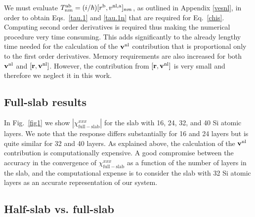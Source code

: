 \documentclass[floatfix,prb,aps,superscriptaddress,11pt,preprint,letterpaper]{revtex4}
\def\chon{black}
\begin{document}
{\color{\chon} 
We must evaluate 
$T^{\mathrm{a}\mathrm{b}}_{nm}=(i/\hbar)[r^{\mathrm{b}},v^{\mathrm{nl},\mathrm{a}}]_{nm}$,
as outlined in Appendix \ref{vesnl},
in order to obtain 
Eqs.~\eqref{tau.1} and \eqref{tau.1n} that are required for 
Eq.~\eqref{chis}.
Computing second 
order derivatives is required thus making the numerical procedure very 
time consuming. This adds significantly to the already lengthy time needed 
for the calculation of the $\mathbf{v}^{\mathrm{nl}}$ contribution that is
proportional only to 
the first order derivatives. 
Memory requirements are also increased for both $\mathbf{v}^{\mathrm{nl}}$ and 
$[\mathbf{r},\mathbf{v}^{\mathrm{nl}}]$. However, the contribution from $[\mathbf{r},\mathbf{v}^{\mathrm{nl}}]$ 
is very small\cite{valerie} and therefore we neglect it in this work.}

\subsection{Full-slab results}\label{fsresults}

In Fig.~\ref{fig1} we show $|\chi_{\mathrm{full-slab}}^{xxx}|$
for {\color{\chon} the} slab {\color{\chon} with} 
16, 24, 32, and 40 Si atomic layers. 
{\color{\chon} We note that the response differs substantially 
for 16 and 24 layers but is quite similar for 32 and 40 layers.}
As explained above,
the calculation of {\color{\chon} the $\mathbf{v}^{\mathrm{nl}}$ contribution is 
computationally expensive.} 
A good compromise between the accuracy in the convergence of
$\chi^{xxx}_{\mathrm{full-slab}}$ as a function of the number
of layers in the slab, and the computational 
{\color{\chon} expense is to consider} 
the slab with 32 Si atomic layers as 
{\color{\chon} an accurate representation} of our 
{\color{\chon} system.}

\subsection{Half-slab vs. full-slab}
\end{document}
